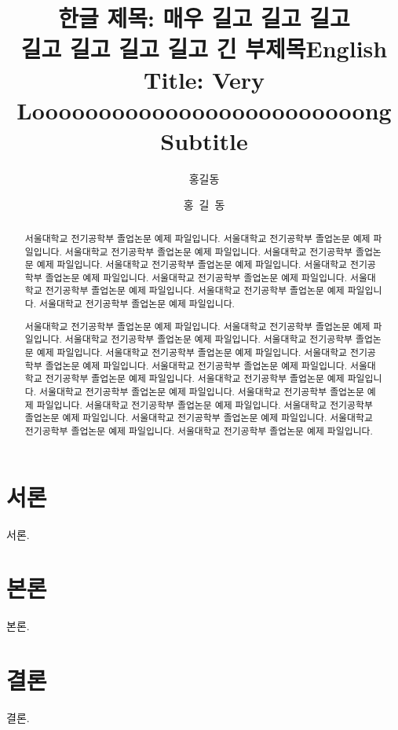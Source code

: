 \documentclass[oneside,ko,phd]{snueethesis}
\title{한글 제목: 매우 길고 길고 길고\\ %
	길고 길고 길고 길고 긴 부제목}
\title*{English Title: Very\\ Looooooooooooooooooooooooong Subtitle}
\author{홍길동}
\author*{홍~길~동} %
\begin{document}
\makefrontcover
\makefrontcover
\makeapproval

\cleardoublepage
{}
\begin{abstract}
서울대학교 전기공학부 졸업논문 예제 파일입니다.
서울대학교 전기공학부 졸업논문 예제 파일입니다.
서울대학교 전기공학부 졸업논문 예제 파일입니다.
서울대학교 전기공학부 졸업논문 예제 파일입니다.
서울대학교 전기공학부 졸업논문 예제 파일입니다.
서울대학교 전기공학부 졸업논문 예제 파일입니다.
서울대학교 전기공학부 졸업논문 예제 파일입니다.
서울대학교 전기공학부 졸업논문 예제 파일입니다.
서울대학교 전기공학부 졸업논문 예제 파일입니다.
서울대학교 전기공학부 졸업논문 예제 파일입니다.

서울대학교 전기공학부 졸업논문 예제 파일입니다.
서울대학교 전기공학부 졸업논문 예제 파일입니다.
서울대학교 전기공학부 졸업논문 예제 파일입니다.
서울대학교 전기공학부 졸업논문 예제 파일입니다.
서울대학교 전기공학부 졸업논문 예제 파일입니다.
서울대학교 전기공학부 졸업논문 예제 파일입니다.
서울대학교 전기공학부 졸업논문 예제 파일입니다.
서울대학교 전기공학부 졸업논문 예제 파일입니다.
서울대학교 전기공학부 졸업논문 예제 파일입니다.
서울대학교 전기공학부 졸업논문 예제 파일입니다.
서울대학교 전기공학부 졸업논문 예제 파일입니다.
서울대학교 전기공학부 졸업논문 예제 파일입니다.
서울대학교 전기공학부 졸업논문 예제 파일입니다.
서울대학교 전기공학부 졸업논문 예제 파일입니다.
서울대학교 전기공학부 졸업논문 예제 파일입니다.
서울대학교 전기공학부 졸업논문 예제 파일입니다.
\end{abstract}

\tableofcontents
\listoftables
\listoffigures

\cleardoublepage
{}

\chapter{서론}
서론.

\chapter{본론}
본론.

\chapter{결론}
결론.
\end{document}
